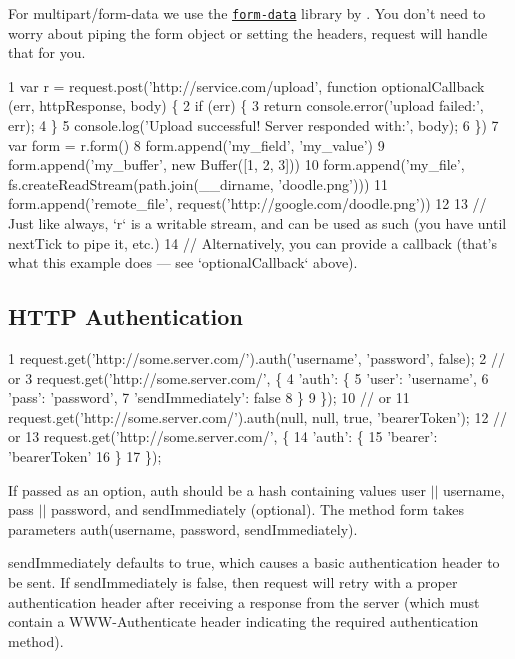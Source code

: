 For {\ttfamily multipart/form-\/data} we use the \href{https://github.com/felixge/node-form-data}{\tt form-\/data} library by \href{https://github.com/felixge}{\tt }. You don’t need to worry about piping the form object or setting the headers, {\ttfamily request} will handle that for you.


\begin{DoxyCode}
1 var r = request.post('http://service.com/upload', function optionalCallback (err, httpResponse, body) \{
2   if (err) \{
3     return console.error('upload failed:', err);
4   \}
5   console.log('Upload successful!  Server responded with:', body);
6 \})
7 var form = r.form()
8 form.append('my\_field', 'my\_value')
9 form.append('my\_buffer', new Buffer([1, 2, 3]))
10 form.append('my\_file', fs.createReadStream(path.join(\_\_dirname, 'doodle.png')))
11 form.append('remote\_file', request('http://google.com/doodle.png'))
12 
13 // Just like always, `r` is a writable stream, and can be used as such (you have until nextTick to pipe it,
       etc.)
14 // Alternatively, you can provide a callback (that's what this example does — see `optionalCallback`
       above).
\end{DoxyCode}


\subsection*{H\+T\+T\+P Authentication}


\begin{DoxyCode}
1 request.get('http://some.server.com/').auth('username', 'password', false);
2 // or
3 request.get('http://some.server.com/', \{
4   'auth': \{
5     'user': 'username',
6     'pass': 'password',
7     'sendImmediately': false
8   \}
9 \});
10 // or
11 request.get('http://some.server.com/').auth(null, null, true, 'bearerToken');
12 // or
13 request.get('http://some.server.com/', \{
14   'auth': \{
15     'bearer': 'bearerToken'
16   \}
17 \});
\end{DoxyCode}


If passed as an option, {\ttfamily auth} should be a hash containing values {\ttfamily user} $\vert$$\vert$ {\ttfamily username}, {\ttfamily pass} $\vert$$\vert$ {\ttfamily password}, and {\ttfamily send\+Immediately} (optional). The method form takes parameters {\ttfamily auth(username, password, send\+Immediately)}.

{\ttfamily send\+Immediately} defaults to {\ttfamily true}, which causes a basic authentication header to be sent. If {\ttfamily send\+Immediately} is {\ttfamily false}, then {\ttfamily request} will retry with a proper authentication header after receiving a {} response from the server (which must contain a {\ttfamily W\+W\+W-\/\+Authenticate} header indicating the required authentication method).

